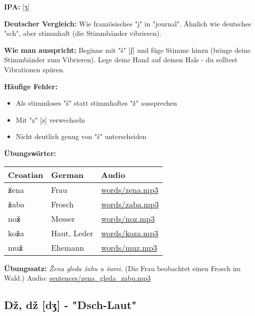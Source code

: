 \begin{tcolorbox}[breakable, colback=lightblue!30, colframe=croatianblue, title=\textbf{Ž, ž}]

\textbf{IPA:} [ʒ]

\textbf{Deutscher Vergleich:}
Wie französisches "j" in "journal". Ähnlich wie deutsches "sch", aber stimmhaft (die Stimmbänder vibrieren).

\textbf{Wie man ausspricht:}
Beginne mit "š" [ʃ] und füge Stimme hinzu (bringe deine Stimmbänder zum Vibrieren). Lege deine Hand auf deinen Hals - du solltest Vibrationen spüren.

\textbf{Häufige Fehler:}
\begin{itemize}
    \item Als stimmloses "š" statt stimmhaftes "ž" aussprechen
    \item Mit "z" [z] verwechseln
    \item Nicht deutlich genug von "š" unterscheiden
\end{itemize}

\textbf{Übungswörter:}
\begin{center}
\small
\begin{tabular}{lll}
\textbf{Croatian} & \textbf{German} & \textbf{Audio} \\
\midrule
\textbf{ž}ena & Frau & \small\url{words/zena.mp3} \\
\textbf{ž}aba & Frosch & \small\url{words/zaba.mp3} \\
no\textbf{ž} & Messer & \small\url{words/noz.mp3} \\
ko\textbf{ž}a & Haut, Leder & \small\url{words/koza.mp3} \\
mu\textbf{ž} & Ehemann & \small\url{words/muz.mp3} \\
\end{tabular}
\end{center}

\textbf{Übungssatz:}
\textit{Žena gleda žabu u šumi.}
(Die Frau beobachtet einen Frosch im Wald.)
Audio: \small\url{sentences/zena\_gleda\_zabu.mp3}

\end{tcolorbox}

\subsection{Dž, dž [dʒ] - "Dsch-Laut"}

